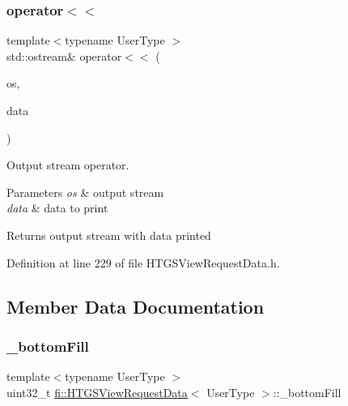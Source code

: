 \subsubsection{\texorpdfstring{operator$<$$<$}{operator<<}}
{\footnotesize\ttfamily template$<$typename User\+Type $>$ \\
std\+::ostream\& operator$<$$<$ (\begin{DoxyParamCaption}\item[{std\+::ostream \&}]{os,  }\item[{const \hyperlink{classfi_1_1HTGSViewRequestData}{H\+T\+G\+S\+View\+Request\+Data}$<$ User\+Type $>$ \&}]{data }\end{DoxyParamCaption})\hspace{0.3cm}{\ttfamily [friend]}}



Output stream operator. 


\begin{DoxyParams}{Parameters}
{\em os} & output stream \\
\hline
{\em data} & data to print \\
\hline
\end{DoxyParams}
\begin{DoxyReturn}{Returns}
output stream with data printed 
\end{DoxyReturn}


Definition at line 229 of file H\+T\+G\+S\+View\+Request\+Data.\+h.



\subsection{Member Data Documentation}
\mbox{\label{classfi_1_1HTGSViewRequestData_ac786787eaf8ce695c3c7c17c84f92791}} 
\subsubsection{\texorpdfstring{\+\_\+bottom\+Fill}{\_bottomFill}}
{\footnotesize\ttfamily template$<$typename User\+Type $>$ \\
uint32\+\_\+t \hyperlink{classfi_1_1HTGSViewRequestData}{fi\+::\+H\+T\+G\+S\+View\+Request\+Data}$<$ User\+Type $>$\+::\+\_\+bottom\+Fill\hspace{0.3cm}{\ttfamily [private]}}



